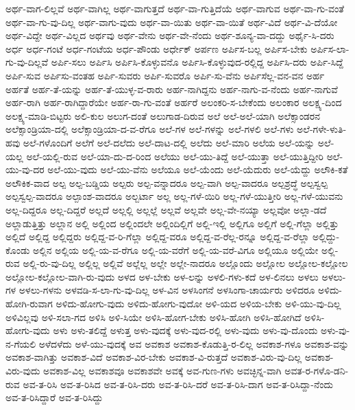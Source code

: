 {ಅರ್ಥ-ವಾಗ-ಲಿಲ್ಲವೆ
ಅರ್ಥ-ವಾಗಿಲ್ಲ
ಅರ್ಥ-ವಾಗುತ್ತದೆ
ಅರ್ಥ-ವಾ-ಗುತ್ತಿದೆಯೆ
ಅರ್ಥ-ವಾಗುವ
ಅರ್ಥ-ವಾ-ಗು-ವಂತೆ
ಅರ್ಥ-ವಾ-ಗು-ವು-ದಿಲ್ಲ
ಅರ್ಥ-ವಾಗು-ವುದು
ಅರ್ಥ-ವಾ-ಯಿತು
ಅರ್ಥ-ವಾ-ಯಿತೆ
ಅರ್ಥ-ವಿದೆ
ಅರ್ಥ-ವಿ-ದೆಯೋ
ಅರ್ಥ-ವಿದ್ದೇ
ಅರ್ಥ-ವಿಲ್ಲದ
ಅರ್ಥವು
ಅರ್ಥ-ವೇನು
ಅರ್ಥ-ವೇ-ನೆಂದು
ಅರ್ಥ-ಶೂನ್ಯ-ವಾ-ದದ್ದು
ಅರ್ಥೈ-ಸಿ-ದರು
ಅರ್ಧ
ಅರ್ಧ-ಗಂಟೆ
ಅರ್ಧ-ಗಂಟೆಯ
ಅರ್ಧ-ಪೌಂಡು
ಅರ್ಧೇಕ್
ಅರ್ಪಣ
ಅರ್ಪಿಸ-ಬಲ್ಲ
ಅರ್ಪಿಸ-ಬೇಕು
ಅರ್ಪಿಸ-ಲಾ-ಗು-ವು-ದಿಲ್ಲವೆ
ಅರ್ಪಿ-ಸಲು
ಅರ್ಪಿಸಿ
ಅರ್ಪಿಸಿ-ಕೊಳ್ಳುವನೊ
ಅರ್ಪಿಸಿ-ಕೊಳ್ಳುವುದ-ರಲ್ಲಿದ್ದ
ಅರ್ಪಿಸಿ-ದರು
ಅರ್ಪಿ-ಸಿದ್ದೆ
ಅರ್ಪಿ-ಸುವ
ಅರ್ಪಿಸು-ವಂತಹ
ಅರ್ಪಿ-ಸುವರು
ಅರ್ಪಿ-ಸುವರೊ
ಅರ್ಪಿ-ಸು-ವೆನು
ಅರ್ಪಿಸೆಲ್ಲ-ವನ-ವನ
ಅರ್ಹ
ಅರ್ಹತೆ
ಅರ್ಹ-ತೆ-ಯನ್ನು
ಅರ್ಹ-ತೆ-ಯುಳ್ಳ-ವ-ರಾರು
ಅರ್ಹ-ನಾಗಿದ್ದನು
ಅರ್ಹ-ನಾಗು-ವ-ನೆಂದು
ಅರ್ಹ-ನಾಗುವೆ
ಅರ್ಹ-ರಾಗಿ
ಅರ್ಹ-ರಾಗಿದ್ದಾರೆಯೇ
ಅರ್ಹ-ರಾ-ಗು-ವಂತೆ
ಅರ್ಹರೆ
ಅಲಂಕರಿ-ಸ-ಬೇಕೆಂದು
ಅಲಂಕಾರ
ಅಲಕ್ಷ್ಯ-ದಿಂದ
ಅಲಕ್ಷ್ಯ-ಮಾಡಿ-ಬಿಟ್ಟರು
ಅಲಿ-ಕುಲ
ಅಲುಗ-ದಂತೆ
ಅಲುಗಾಡ-ದಿರುವ
ಅಲೆ
ಅಲೆ-ಅಲೆ-ಯಾಗಿ
ಅಲೆಕ್ಸಾಂಡರನ
ಅಲೆಕ್ಸಾಂಡ್ರಿಯಾ-ದಲ್ಲಿ
ಅಲೆಕ್ಸಾಂಡ್ರಿಯಾ-ದ-ವ-ರೆಗೂ
ಅಲೆ-ಗಳ
ಅಲೆ-ಗಳನ್ನು
ಅಲೆ-ಗಳಲಿ
ಅಲೆ-ಗಳು
ಅಲೆ-ಗಳೇ-ಳುತಿ-ಹವು
ಅಲೆ-ಗಳೊಂದಿಗೆ
ಅಲೆಗೆ
ಅಲೆ-ದಲೆದು
ಅಲೆ-ದಾಟ-ದಲ್ಲಿ
ಅಲೆದು
ಅಲೆ-ಮಾರಿ
ಅಲೆಯ
ಅಲೆ-ಯನ್ನು
ಅಲೆ-ಯಲ್ಲ
ಅಲೆ-ಯಲ್ಲಿ-ರುವ
ಅಲೆ-ಯಾ-ದು-ದ-ರಿಂದ
ಅಲೆಯು
ಅಲೆ-ಯು-ತಿದ್ದೆ
ಅಲೆ-ಯುತ್ತಾ
ಅಲೆ-ಯುತ್ತಿದ್ದೀರಿ
ಅಲೆ-ಯು-ವು-ದರ
ಅಲೆ-ಯು-ವುದು
ಅಲೆ-ಯು-ವೆನು
ಅಲೆಯೂ
ಅಲೆ-ಯೆಂದು
ಅಲೆ-ಯೆದುರು
ಅಲೆ-ಯೆದ್ದು
ಅಲೌಕಿ-ಕತೆ
ಅಲೌಕಿಕ-ವಾದ
ಅಲ್ಪ
ಅಲ್ಪ-ಬಡ್ಡಿಯ
ಅಲ್ಪರು
ಅಲ್ಪ-ವನ್ನಾದರೂ
ಅಲ್ಪ-ವಾಗಿ
ಅಲ್ಪ-ವಾದರೂ
ಅಲ್ಪಶ್ರದ್ಧೆ
ಅಲ್ಪಸ್ವಲ್ಪ
ಅಲ್ಪಸ್ವಲ್ಪ-ವಾದರೂ
ಅಲ್ಪಾಂಶ-ವಾದರೂ
ಅಲ್ಬರ್ಟಾ
ಅಲ್ಲ
ಅಲ್ಲ-ಗಳೆ-ಯಿರಿ
ಅಲ್ಲ-ಗಳೆ-ಯುತ್ತೀರಿ
ಅಲ್ಲ-ಗಳೆ-ಯುವನು
ಅಲ್ಲ-ದಿದ್ದರೂ
ಅಲ್ಲ-ದಿದ್ದರೆ
ಅಲ್ಲದೆ
ಅಲ್ಲಲ್ಲಿ
ಅಲ್ಲಲ್ಲೆ
ಅಲ್ಲವೆ
ಅಲ್ಲವೇ
ಅಲ್ಲ-ವೇ-ನಯ್ಯಾ
ಅಲ್ಲವೋ
ಅಲ್ಲಾ-ಡದೆ
ಅಲ್ಲಾಡುತ್ತಿತ್ತು
ಅಲ್ಲಾನ
ಅಲ್ಲಿ
ಅಲ್ಲಿಂದ
ಅಲ್ಲಿಂದಲೇ
ಅಲ್ಲಿಂದಿಲ್ಲಿಗೆ
ಅಲ್ಲಿ-ಇಲ್ಲಿ
ಅಲ್ಲಿಗೂ
ಅಲ್ಲಿಗೆ
ಅಲ್ಲಿ-ಗೆಲ್ಲಾ
ಅಲ್ಲಿತ್ತು
ಅಲ್ಲಿದೆ
ಅಲ್ಲಿದ್ದ
ಅಲ್ಲಿದ್ದರು
ಅಲ್ಲಿದ್ದ-ವ-ರಿ-ಗೆಲ್ಲಾ
ಅಲ್ಲಿದ್ದ-ವರೂ
ಅಲ್ಲಿದ್ದ-ವ-ರೆಲ್ಲ-ರನ್ನೂ
ಅಲ್ಲಿದ್ದ-ವ-ರೆಲ್ಲಾ
ಅಲ್ಲಿದ್ದು-ಕೊಂಡು
ಅಲ್ಲಿನ
ಅಲ್ಲಿಯ
ಅಲ್ಲಿ-ಯ-ವ-ರೆಗೂ
ಅಲ್ಲಿ-ಯ-ವರೆಗೆ
ಅಲ್ಲಿ-ಯ-ವರೆ-ವಿಗೂ
ಅಲ್ಲಿಯೂ
ಅಲ್ಲಿಯೇ
ಅಲ್ಲಿ-ರುವ
ಅಲ್ಲಿ-ರು-ವು-ದಿಲ್ಲ
ಅಲ್ಲಿಲ್ಲ
ಅಲ್ಲಿವೆ
ಅಲ್ಲೆಲ್ಲ
ಅಲ್ಲೇ
ಅಲ್ಲೇ-ನಾದರೂ
ಅಲ್ಲೊಂದು
ಅಲ್ಲೋಲ
ಅಲ್ಲೋಲ-ಕಲ್ಲೋಲ
ಅಲ್ಲೋಲ-ಕಲ್ಲೋಲ-ವಾಗಿ-ರು-ವುದು
ಅಳದ
ಅಳ-ಬೇಕು
ಅಳ-ಲನ್ನು
ಅಳಲಿ-ಗಳು-ಕದೆ
ಅಳ-ಲಿನಲು
ಅಳಲು
ಅಳಲು-ಗಳ
ಅಳಲು-ಗಳನು
ಅಳವಡಿ-ಸ-ಲಾ-ಗು-ವು-ದಿಲ್ಲ
ಅಳ-ವಿನ
ಅಳಸಿಂಗನೆ
ಅಳಸಿಂಗಾ-ಚಾರ್ಯರು
ಅಳಿದರೂ
ಅಳಿದು-ಹೋಗಿ-ರುವಾಗ
ಅಳಿದು-ಹೋಗು-ವುದು
ಅಳಿದು-ಹೋಗು-ವುದೋ
ಅಳಿ-ಯದ
ಅಳಿಯ-ಬೇಕು
ಅಳಿ-ಯು-ವು-ದಿಲ್ಲ
ಅಳಿವಿಲ್ಲವು
ಅಳಿ-ಸಲಾ-ಗದ
ಅಳಿಸಿ
ಅಳಿ-ಸಿಯೇ
ಅಳಿಸಿ-ಹೋಗ-ಬೇಕು
ಅಳಿಸಿ-ಹೋಗಿ
ಅಳಿಸಿ-ಹೋಗಿದೆ
ಅಳಿಸಿ-ಹೋಗು-ವುದು
ಅಳು
ಅಳು-ತಲಿದ್ದೆ
ಅಳುತ್ತ
ಅಳು-ವುದಕ್ಕೆ
ಅಳು-ವುದ-ರಲ್ಲಿ
ಅಳು-ವುದು
ಅಳು-ವು-ದೊಂದು
ಅಳು-ವು-ನ-ಗೆಯಲಿ
ಅಳೆದಳೆದು
ಅಳೆ-ಯು-ವುದಕ್ಕೆ
ಅವ
ಅವಕಾಶ
ಅವಕಾಶ-ಕೊಡುತ್ತಿ-ರ-ಲಿಲ್ಲ
ಅವಕಾಶ-ಗಳೂ
ಅವಕಾಶ-ವನ್ನು
ಅವಕಾಶ-ವಾಗಿತ್ತು
ಅವಕಾಶ-ವಿದೆ
ಅವಕಾಶ-ವಿರ-ಬೇಕು
ಅವಕಾಶ-ವಿ-ರುತ್ತದೆ
ಅವಕಾಶ-ವಿರು-ವು-ದಿಲ್ಲ
ಅವಕಾಶ-ವಿರು-ವುದು
ಅವಕಾಶ-ವಿಲ್ಲ
ಅವಕಾಶವೂ
ಅವಕಾಶವೇ
ಅವಕ್ಕೆ
ಅವ-ಗುಣ-ಗಳು
ಅವಚ್ಛಿನ್ನ-ವಾಗಿ
ಅವತ-ರ-ಗಳೊ-ಡನಿ-ರುವ
ಅವ-ತ-ರಿಸಿ
ಅವ-ತ-ರಿಸಿದ
ಅವ-ತ-ರಿಸಿ-ದರು
ಅವ-ತ-ರಿಸಿ-ದರೆ
ಅವ-ತ-ರಿಸಿ-ದಾಗ
ಅವ-ತ-ರಿಸಿದ್ದಾ-ನೆಂದು
ಅವ-ತ-ರಿಸಿದ್ದಾರೆ
ಅವ-ತ-ರಿಸಿದ್ದು
}
